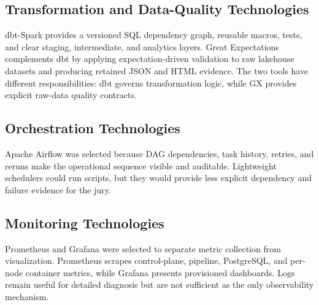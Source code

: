 \subsection{Transformation and Data-Quality Technologies}
dbt-Spark provides a versioned SQL dependency graph, reusable macros, tests, and clear staging, intermediate, and analytics layers. Great Expectations complements dbt by applying expectation-driven validation to raw lakehouse datasets and producing retained JSON and HTML evidence. The two tools have different responsibilities: dbt governs transformation logic, while GX provides explicit raw-data quality contracts.

\subsection{Orchestration Technologies}
Apache Airflow was selected because DAG dependencies, task history, retries, and reruns make the operational sequence visible and auditable. Lightweight schedulers could run scripts, but they would provide less explicit dependency and failure evidence for the jury.

\subsection{Monitoring Technologies}
Prometheus and Grafana were selected to separate metric collection from visualization. Prometheus scrapes control-plane, pipeline, PostgreSQL, and per-node container metrics, while Grafana presents provisioned dashboards. Logs remain useful for detailed diagnosis but are not sufficient as the only observability mechanism.

